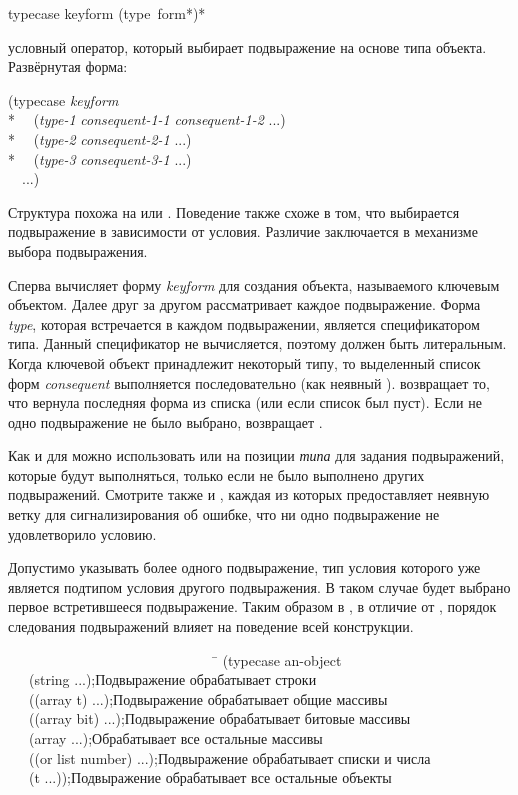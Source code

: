 \begin{defmac}
typecase keyform {(type {\,form}*)}*

 условный оператор, который выбирает подвыражение на основе типа
объекта.
Развёрнутая форма:
\begin{lisp}
(typecase \emph{keyform} \\*
~~(\emph{type-1} \emph{consequent-1-1} \emph{consequent-1-2} ...) \\*
~~(\emph{type-2} \emph{consequent-2-1} ...) \\*
~~(\emph{type-3} \emph{consequent-3-1} ...) \\
~~...)
\end{lisp}
Структура  похожа на  или . Поведение также
схоже в том, что выбирается подвыражение в зависимости от условия.
Различие заключается в механизме выбора подвыражения.

Сперва  вычисляет форму \emph{keyform} для создания объекта,
называемого ключевым объектом.
Далее  друг за другом рассматривает каждое подвыражение. Форма
\emph{type}, которая встречается в каждом подвыражении, является спецификатором
типа. Данный спецификатор не вычисляется, поэтому должен быть литеральным.
Когда ключевой объект принадлежит некоторый типу, то выделенный список форм
\emph{consequent} выполняется последовательно (как неявный
).  возвращает то, что вернула последняя форма из
списка (или {\false} если список был пуст).
Если не одно подвыражение не было выбрано,  возвращает {\false}.

Как и для  можно использовать {\true} или  на позиции
\emph{типа} для задания подвыражений, которые будут выполняться, только если не
было выполнено других подвыражений.
Смотрите также  и , каждая из которых
предоставляет неявную ветку  для сигнализирования об ошибке, что
ни одно подвыражение не удовлетворило условию.

Допустимо указывать более одного подвыражение, тип условия которого уже является
подтипом условия другого подвыражения. В таком случае будет выбрано первое
встретившееся подвыражение. Таким образом в , в отличие от
, порядок следования подвыражений влияет на поведение всей
конструкции.
\begin{lisp}
~~~~~~~~~~~~~~~~~~~~~~~~~~~~~~\=\kill
(typecase an-object \\
~~~(string ...)\>;\textrm{Подвыражение обрабатывает строки} \\
~~~((array t) ...)\>;\textrm{Подвыражение обрабатывает общие массивы} \\
~~~((array bit) ...)\>;\textrm{Подвыражение обрабатывает битовые массивы} \\
~~~(array ...)\>;\textrm{Обрабатывает все остальные массивы} \\
~~~((or list number) ...)\>;\textrm{Подвыражение обрабатывает списки и числа} \\
~~~(t ...))\>;\textrm{Подвыражение обрабатывает все остальные объекты}
\end{lisp}
\end{defmac}

